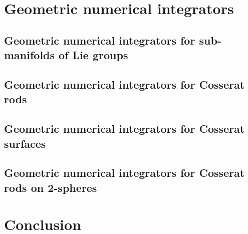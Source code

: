 \chapter{Geometric numerical integrators}

\section{Geometric numerical integrators for sub-manifolds of Lie groups}

\section{Geometric numerical integrators for Cosserat rods}

\section{Geometric numerical integrators for Cosserat surfaces}

\section{Geometric numerical integrators for Cosserat rods on 2-spheres}




\chapter{Conclusion}

